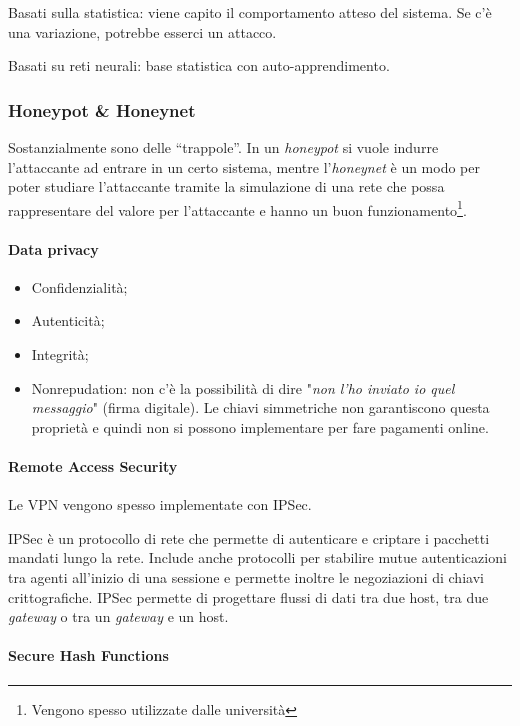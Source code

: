 Basati sulla statistica: viene capito il comportamento atteso del sistema. Se
c'è una variazione, potrebbe esserci un attacco.

Basati su reti neurali: base statistica con auto-apprendimento.

\subsubsection{Honeypot \& Honeynet}

Sostanzialmente sono delle ``trappole''. In un \textit{honeypot} si vuole
indurre l'attaccante ad entrare in un certo sistema, mentre l'\textit{honeynet}
è un modo per poter studiare l'attaccante tramite la simulazione di una rete che
possa rappresentare del valore per l'attaccante e hanno un buon
funzionamento\footnote{Vengono spesso utilizzate dalle università}.

\paragraph{Data privacy}

\begin{itemize}
\item Confidenzialità;
\item Autenticità;
\item Integrità;
\item Nonrepudation: non c'è la possibilità di dire "\textit{non l'ho inviato io
quel messaggio}" (firma digitale). Le chiavi simmetriche non garantiscono questa
proprietà e quindi non si possono implementare per fare pagamenti online.
\end{itemize}

\paragraph{Remote Access Security}

Le VPN vengono spesso implementate con IPSec.

IPSec è un protocollo di rete che permette di autenticare e criptare i
pacchetti mandati lungo la rete. Include anche protocolli per stabilire mutue
autenticazioni tra agenti all'inizio di una sessione e permette inoltre le
negoziazioni di chiavi crittografiche. IPSec permette di progettare flussi di
dati tra due host, tra due \textit{gateway} o tra un \textit{gateway} e un
host.

\paragraph{Secure Hash Functions}

